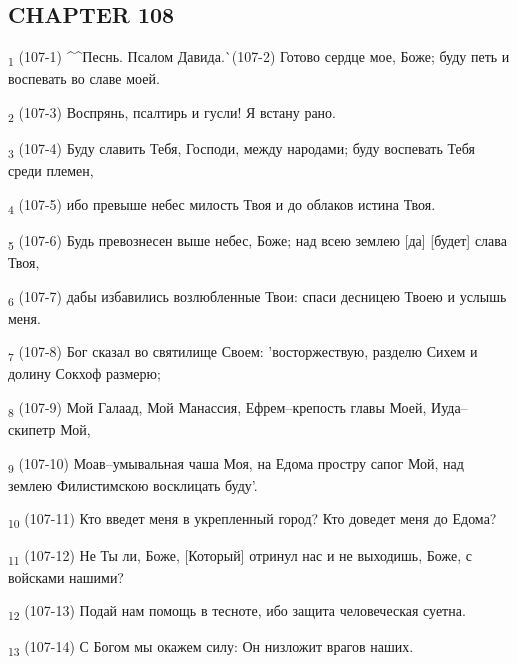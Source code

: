\subsection{CHAPTER 108}
\begin{tcolorbox}
\textsubscript{1} (107-1) ^^Песнь. Псалом Давида.^^ (107-2) Готово сердце мое, Боже; буду петь и воспевать во славе моей.
\end{tcolorbox}
\begin{tcolorbox}
\textsubscript{2} (107-3) Воспрянь, псалтирь и гусли! Я встану рано.
\end{tcolorbox}
\begin{tcolorbox}
\textsubscript{3} (107-4) Буду славить Тебя, Господи, между народами; буду воспевать Тебя среди племен,
\end{tcolorbox}
\begin{tcolorbox}
\textsubscript{4} (107-5) ибо превыше небес милость Твоя и до облаков истина Твоя.
\end{tcolorbox}
\begin{tcolorbox}
\textsubscript{5} (107-6) Будь превознесен выше небес, Боже; над всею землею [да] [будет] слава Твоя,
\end{tcolorbox}
\begin{tcolorbox}
\textsubscript{6} (107-7) дабы избавились возлюбленные Твои: спаси десницею Твоею и услышь меня.
\end{tcolorbox}
\begin{tcolorbox}
\textsubscript{7} (107-8) Бог сказал во святилище Своем: 'восторжествую, разделю Сихем и долину Сокхоф размерю;
\end{tcolorbox}
\begin{tcolorbox}
\textsubscript{8} (107-9) Мой Галаад, Мой Манассия, Ефрем--крепость главы Моей, Иуда--скипетр Мой,
\end{tcolorbox}
\begin{tcolorbox}
\textsubscript{9} (107-10) Моав--умывальная чаша Моя, на Едома простру сапог Мой, над землею Филистимскою восклицать буду'.
\end{tcolorbox}
\begin{tcolorbox}
\textsubscript{10} (107-11) Кто введет меня в укрепленный город? Кто доведет меня до Едома?
\end{tcolorbox}
\begin{tcolorbox}
\textsubscript{11} (107-12) Не Ты ли, Боже, [Который] отринул нас и не выходишь, Боже, с войсками нашими?
\end{tcolorbox}
\begin{tcolorbox}
\textsubscript{12} (107-13) Подай нам помощь в тесноте, ибо защита человеческая суетна.
\end{tcolorbox}
\begin{tcolorbox}
\textsubscript{13} (107-14) С Богом мы окажем силу: Он низложит врагов наших.
\end{tcolorbox}
